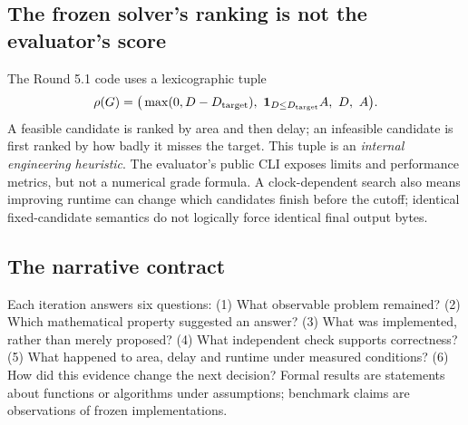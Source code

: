 \subsection{The frozen solver's ranking is not the evaluator's score}
The Round 5.1 code uses a lexicographic tuple
\[
\rho(G)=\big(\max(0,D-D_{\rm target}),\ \mathbf1_{D\le D_{\rm target}}A,\ D,\ A\big).
\]
A feasible candidate is ranked by area and then delay; an infeasible candidate is first ranked by how badly it misses the target. This tuple is an \emph{internal engineering heuristic}. The evaluator's public CLI exposes limits and performance metrics, but not a numerical grade formula. A clock-dependent search also means improving runtime can change which candidates finish before the cutoff; identical fixed-candidate semantics do not logically force identical final output bytes.

\subsection{The narrative contract}
Each iteration answers six questions: (1) What observable problem remained? (2) Which mathematical property suggested an answer? (3) What was implemented, rather than merely proposed? (4) What independent check supports correctness? (5) What happened to area, delay and runtime under measured conditions? (6) How did this evidence change the next decision? Formal results are statements about functions or algorithms under assumptions; benchmark claims are observations of frozen implementations.

